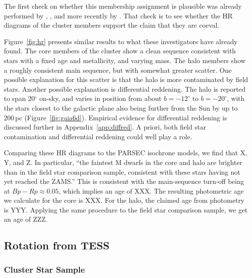 \documentclass[12pt,twocolumn,tighten]{aastex63}
\begin{document}
The first check on whether this membership assignment is plausible was
already performed by ,
, and more recently by
\citet{meingast_2021}.  That check is to see whether the HR diagrams
of the cluster members support the claim that they are coeval.

Figure~\ref{fig:hr} presents similar results to what these
investigators have already found.  The core members of the cluster
show a clean sequence consistent with stars with a fixed age and
metallicity, and varying mass.  The halo members show a roughly
consistent main sequence, but with somewhat greater scatter.  One
possible explanation for this scatter is that the halo is more
contaminated by field stars.  Another possible explanation is
differential reddening.  The halo is reported to span 20$^\circ$
on-sky, and varies in position from about $b=-12^\circ$ to
$b=-20^\circ$, with the stars closest to the galactic plane also being
further from the Sun by up to 200\,pc (Figure~\ref{fig:gaia6d}).
Empirical evidence for differential reddening is discussed further in
Appendix~\ref{app:diffred}. A priori, both field star contamination
and differential reddening could well play a role.

Comparing these HR diagrams to the PARSEC isochrone models, we find
that X, Y, and Z.
In particular, ``the faintest M dwarfs in the core and halo are
brighter than in the field star comparison sample, consistent with
these stars having not yet reached the ZAMS.''
This is consistent with the 
main-sequence turn-off being at $Bp-Rp\approx0.05$, which implies an
age of XXX.
The resulting photometric age we calculate for the core is XXX.
For the halo, the claimed age from photometry is YYY.
Applying the same procedure to the field star comparison sample,
we get an age of ZZZ.


\subsection{Rotation from TESS}
\label{subsec:tess}

\subsubsection{Cluster Star Sample}
\end{document}
